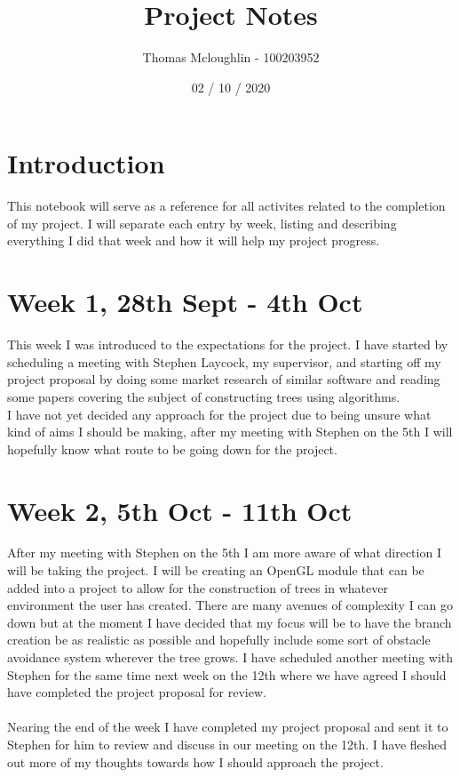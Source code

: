 \documentclass[12pt]{article}
\title{Project Notes}
\author{Thomas Mcloughlin - 100203952}
\date{02 / 10 / 2020}
\begin{document}
\maketitle

\pagebreak
\section*{Introduction}
This notebook will serve as a reference for all activites related to the completion
of my project. I will separate each entry by week, listing and describing everything
I did that week and how it will help my project progress.

\section*{Week 1, 28th Sept - 4th Oct}
This week I was introduced to the expectations for the project. I have started by 
scheduling a meeting with Stephen Laycock, my supervisor, and starting off my project 
proposal by doing some market research of similar software and reading some papers 
covering the subject of constructing trees using algorithms. \\
I have not yet decided any approach for the project due to being unsure what kind of 
aims I should be making, after my meeting with Stephen on the 5th I will hopefully 
know what route to be going down for the project.

\section*{Week 2, 5th Oct - 11th Oct}
After my meeting with Stephen on the 5th I am more aware of what direction I will be 
taking the project. I will be creating an OpenGL module that can be added into a 
project to allow for the construction of trees in whatever environment the user has 
created. There are many avenues of complexity I can go down but at the moment I have 
decided that my focus will be to have the branch creation be as realistic as possible 
and hopefully include some sort of obstacle avoidance system wherever the tree grows.
I have scheduled another meeting with Stephen for the same time next week on the 12th 
where we have agreed I should have completed the project proposal for review. \\ \\
Nearing the end of the week I have completed my project proposal and sent it to 
Stephen for him to review and discuss in our meeting on the 12th. I have fleshed out 
more of my thoughts towards how I should approach the project.
\end{document}
